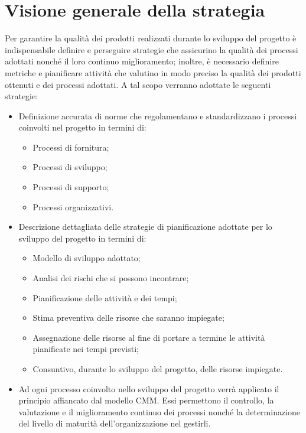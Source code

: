 \documentclass[../PianoDiQualifica.tex]{subfiles}
\begin{document}
	\section{Visione generale della strategia}
		Per garantire la qualità dei prodotti realizzati durante lo sviluppo del
		progetto è indispensabile definire e perseguire strategie che assicurino la
		qualità dei processi adottati nonché il loro continuo miglioramento;
		inoltre, è necessario definire metriche e pianificare attività che valutino in
		modo preciso la qualità dei prodotti ottenuti e dei processi adottati. A tal
		scopo verranno adottate le seguenti strategie:
		\begin{itemize}
			\item Definizione accurata di norme che regolamentano e standardizzano i
			processi coinvolti nel progetto in termini di:
				\begin{itemize}
					\item Processi di fornitura;
					\item Processi di sviluppo;
					\item Processi di supporto;
					\item Processi organizzativi.
				\end{itemize}
			\item Descrizione dettagliata delle strategie di pianificazione adottate
			per lo sviluppo del progetto in termini di:
				\begin{itemize}
					\item Modello di sviluppo adottato;
					\item Analisi dei rischi che si possono incontrare;
					\item Pianificazione delle attività e dei tempi;
					\item Stima preventiva delle risorse che saranno impiegate;
					\item Assegnazione delle risorse al fine di portare a termine le
					attività pianificate nei tempi previsti;
					\item Consuntivo, durante lo sviluppo del progetto, delle risorse
					impiegate.
				\end{itemize}
			\item Ad ogni processo coinvolto nello sviluppo del progetto verrà applicato
			il principio  affiancato dal modello CMM. Essi permettono il
			controllo, la valutazione e il miglioramento continuo dei processi nonché
			la determinazione del livello di maturità dell'organizzazione nel gestirli.
		\end{itemize}
\end{document}
